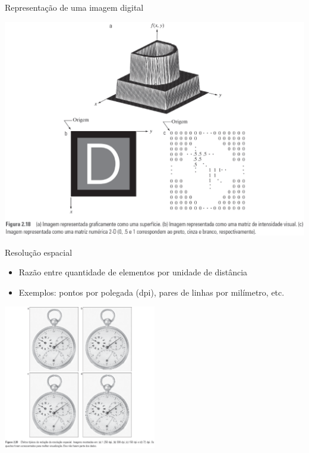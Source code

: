    \begin{slide}[toc=]{Representação de uma imagem digital}
        \begin{center}
          \includegraphics[width=.8\textwidth]{figs/fig0218}
        \end{center}
   \end{slide}
   
   \begin{slide}[toc=]{Resolução espacial}
   \begin{itemize}
    \item Razão entre quantidade de elementos por unidade de distância
    \item Exemplos: pontos por polegada (dpi), pares de linhas por milímetro, etc.
   \end{itemize}
        \begin{center}
          \includegraphics[width=0.5\textwidth]{figs/fig0220}
        \end{center}
   \end{slide}
   
